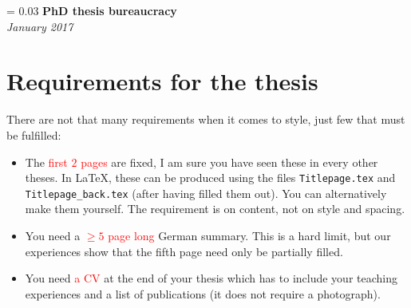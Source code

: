 \documentclass[a4paper]{article}
\newlength{\titleVerticalSpacing}
\newcommand{\myTitle}[2]{%
    \begingroup
        \titleVerticalSpacing = 0.03\textheight
        \centering
        \vspace*{\titleVerticalSpacing}
        {\Huge\bfseries #1}\\[\baselineskip]
        {\itshape #2}\\[3\baselineskip]
    \endgroup
}
\begin{document}
    
    \myTitle{PhD thesis bureaucracy}{January 2017}

    \section*{Requirements for the thesis}
        There are not that many requirements when it comes to style, just few that must be fulfilled:
        \begin{itemize}
            \item The \textcolor{red}{first $2$ pages} are fixed, I am sure you have seen these in every other theses.
                  In \LaTeX, these can be produced using the files \texttt{Titlepage.tex} and \texttt{Titlepage\_back.tex} (after having filled them out).
                  You can alternatively make them yourself. The requirement is on content, not on style and spacing.
            \item You need a \textcolor{red}{$\geq 5$ page long} German summary. This is a hard limit, but our experiences show that the fifth page need
              only be partially filled.
            \item You need \textcolor{red}{a CV} at the end of your thesis which has to include your teaching experiences and a list of publications
              (it does not require a photograph).
        \end{itemize}
        
        
\end{document}
